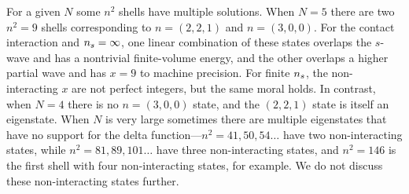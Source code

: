 For a given $N$ some $n^2$ shells have multiple solutions.
When $N=5$ there are two $n^2=9$ shells corresponding to $n=(2,2,1)$ and $n=(3,0,0)$.
For the contact interaction and ${n_s}=\infty$, one linear combination of these \Aoneg states overlaps the $s$-wave and has a nontrivial finite-volume energy, and the other overlaps a higher partial wave and has $x=9$ to machine precision.
For finite ${n_s}$, the non-interacting $x$ are not perfect integers, but the same moral holds.
In contrast, when $N=4$ there is no $n=(3,0,0)$ state, and the $(2,2,1)$ state is itself an eigenstate.
When $N$ is very large sometimes there are multiple eigenstates that have no support for the delta function---$n^2=41, 50, 54\ldots$ have two non-interacting states, while $n^2=81, 89, 101\ldots$ have three non-interacting states, and $n^2=146$ is the first shell with four non-interacting states, for example.
We do not discuss these non-interacting states further.
